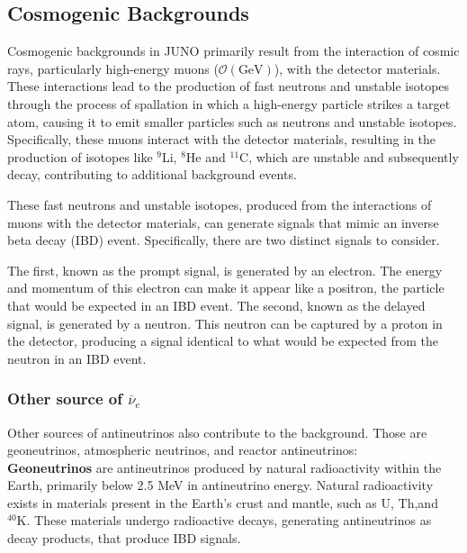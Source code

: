 \subsection*{Cosmogenic Backgrounds}

Cosmogenic backgrounds in JUNO primarily result from the interaction of cosmic rays, particularly high-energy muons ($\mathcal{O}(\text{GeV})$), with the detector materials. These interactions lead to the production of fast neutrons and unstable isotopes through the process of spallation in which a high-energy particle strikes a target atom, causing it to emit smaller particles such as neutrons and unstable isotopes. Specifically, these muons interact with the detector materials, resulting in the production of isotopes like  $^{9}\mathrm{Li}$, $^{8}\mathrm{He}$ and $^{11}\mathrm{C}$, which are unstable and subsequently decay, contributing to additional background events.

These fast neutrons and unstable isotopes, produced from the interactions of muons with the detector materials, can generate signals that mimic an inverse beta decay (IBD) event. Specifically, there are two distinct signals to consider.

The first, known as the prompt signal, is generated by an electron. The energy and momentum of this electron can make it appear like a positron, the particle that would be expected in an IBD event. The second, known as the delayed signal, is generated by a neutron. This neutron can be captured by a proton in the detector, producing a signal identical to what would be expected from the neutron in an IBD event.


\subsubsection*{Other source of  $\overline{\nu}_e$}

Other sources of antineutrinos also contribute to the background. Those are geoneutrinos, atmospheric neutrinos, and reactor antineutrinos:\\

\textbf{Geoneutrinos} are antineutrinos produced by natural radioactivity within the Earth, primarily below 2.5 MeV in antineutrino energy. Natural radioactivity exists in materials present in the Earth's crust and mantle, such as $\mathrm{U}$, $\mathrm{Th}$,and $^{40}\mathrm{K}$. These materials undergo radioactive decays, generating antineutrinos as decay products, that produce IBD signals.\\

